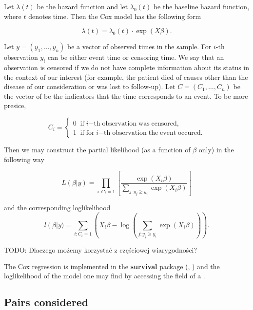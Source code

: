Let $\lambda(t)$ be the hazard function and let $\lambda_0(t)$ be the baseline hazard function, where $t$ denotes time. Then the Cox model has the following form

$$\lambda(t) = 
\lambda_0(t)\cdot \exp{(X\beta)}.$$

Let $y = (y_1, \ldots, y_n)$ be a vector of observed times in the sample. For $i$-th observation $y_i$ can be either event time or censoring time. We say that an observation is censored if we do not have complete information about its status in the context of our interest (for example, the patient died  of causes other than the disease of our consideration or was lost to follow-up). Let $C = (C_1, \ldots, C_n)$ be the vector of be the indicators that the time corresponds to an event. To be more presice,

$$C_i = \left\{
                \begin{array}{ll}
                  0 \;\; \mathrm{if} \; i \mathrm{-th \;
                  observation \; was \; censored,}\\
                  1 \;\; \mathrm{if \; for} \; i 
                  \mathrm{-th \; 
                  observation \; the \; event \; occured.}
                \end{array}
              \right.$$

Then we may construct the partial likelihood (as a function of $\beta$ only) in the following way

$$L(\beta|y) = 
	\prod_{i: C_i = 1}
		\left[
			\frac{\exp{\left(X_i\beta\right)}}
					{\sum_{j: y_j \geq y_i} 
					\exp{\left(X_i\beta\right)}}
			\right]$$
			
and the corresponding loglikelihood
$$
l\left(\beta\right|y) = 
	\sum_{i:C_i = 1} 
		\left(
			X_i\beta -
			\log{
				\left(
				\sum_{j:y_j\geq y_i} 
				\exp{\left(X_i\beta\right)}		
				\right)
			}
		\right).
$$

TODO: Dlaczego możemy korzystać z częściowej wiarygodności?

The Cox regression is implemented in the \textbf{survival} package (, \citealp{survival-book})
and the loglikelihood of the model one may find by accessing the field  of a .



\subsection{Pairs considered}

